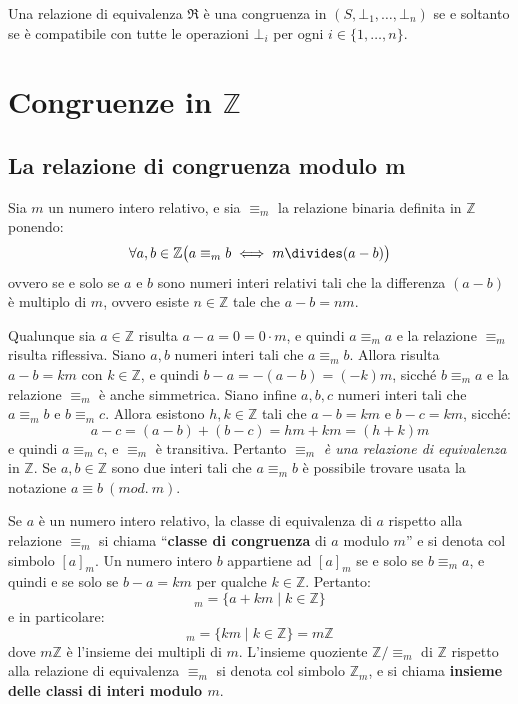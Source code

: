 \begin{osservation}
	Una relazione di equivalenza $\mathfrak{R}$ è una congruenza in $(S,\bot_{1},\ldots,\bot_{n})$ se e soltanto se è compatibile con tutte le operazioni $\bot_{i}$ per ogni $i \in \{1, \ldots, n\}$.
\end{osservation}

\section{Congruenze in $\mathbb{Z}$}

\subsection{La relazione di congruenza modulo m}

Sia $m$ un numero intero relativo, e sia $\equiv_{m}$ la relazione binaria definita in $\mathbb{Z}$ ponendo:
\begin{equation}
	\forall a,b \in \mathbb{Z} \bigl(a \equiv_{m} b \iff m \divides (a-b)\bigr)
\end{equation}
ovvero se e solo se $a$ e $b$ sono numeri interi relativi tali che la differenza $(a-b)$ è multiplo di $m$, ovvero esiste $n \in \mathbb{Z}$ tale che $a-b=nm$.

Qualunque sia $a \in \mathbb{Z}$ risulta $a-a=0=0 \cdot m$, e quindi $a \equiv_{m} a$ e la relazione $\equiv_{m}$ risulta riflessiva. Siano $a,b$ numeri interi tali che $a \equiv_{m} b$. Allora risulta $a-b=km$ con $k \in \mathbb{Z}$, e quindi $b-a=-(a-b)=(-k)m$, sicché $b \equiv_{m} a$ e la relazione $\equiv_{m}$ è anche simmetrica. Siano infine $a,b,c$ numeri interi tali che $a \equiv_{m} b$ e $b \equiv_{m} c$. Allora esistono $h,k \in \mathbb{Z}$ tali che $a-b = km$ e $b-c=km$, sicché:
\begin{displaymath}
	a-c = (a-b)+(b-c) = hm+km=(h+k)m
\end{displaymath}
e quindi $a \equiv_{m} c$, e $\equiv_{m}$ è transitiva. Pertanto $\equiv_{m}$ \emph{è una relazione di equivalenza} in $\mathbb{Z}$. Se $a,b \in \mathbb{Z}$ sono due interi tali che $a \equiv_{m} b$ è possibile trovare usata la notazione $a \equiv b \ (mod. \ m)$.

Se $a$ è un numero intero relativo, la classe di equivalenza di $a$ rispetto alla relazione $\equiv_{m}$ si chiama ``\textbf{classe di congruenza} di $a$ modulo $m$'' e si denota col simbolo $[a]_{m}$. Un numero intero $b$ appartiene ad $[a]_{m}$ se e solo se $b \equiv_{m} a$, e quindi e se solo se $b-a=km$ per qualche $k \in \mathbb{Z}$. Pertanto:
\begin{displaymath}
	[a]_{m} = \{a +km \; | \; k \in \mathbb{Z}\}
\end{displaymath}
e in particolare:
\begin{displaymath}
	[0]_{m} = \{km \; | \; k \in \mathbb{Z}\} = m\mathbb{Z}
\end{displaymath}
dove $m\mathbb{Z}$ è l'insieme dei multipli di $m$. L'insieme quoziente $\mathbb{Z}/{\equiv_{m}}$ di $\mathbb{Z}$ rispetto alla relazione di equivalenza $\equiv_{m}$ si denota col simbolo $\mathbb{Z}_{m}$, e si chiama \textbf{insieme delle classi di interi modulo $m$}.

